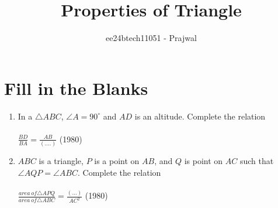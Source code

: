 \documentclass[journal,12pt,twocolumn]{IEEEtran}
\theoremstyle{remark}
\begin{document}

\vspace{3cm}

\title{Properties of Triangle}
\author{ee24btech11051 - Prajwal}
\maketitle
\newpage
\bigskip

\renewcommand{\thefigure}{\theenumi}
\renewcommand{\thetable}{\theenumi}
\section{Fill in the Blanks}
\begin{enumerate}
    \item In a $\triangle ABC$, $\angle A=90^\circ$ and $AD$ is an altitude. Complete the relation\\
    \\
    $\displaystyle \frac{BD}{BA} = \displaystyle \frac{AB}{(....)}$
    \hfill (1980)\\
    
    \item $ABC$ is a triangle, $P$ is a point on $AB$, and $Q$ is point on $AC$ such that $\angle AQP = \angle ABC$. Complete the relation\\
    \\
    $\displaystyle\frac{area\ of \triangle APQ}{area\ of \triangle ABC} =\displaystyle\frac{(...)}{AC^2}$
    \hfill (1980)
    \\
    

\end{enumerate}
\end{document}
